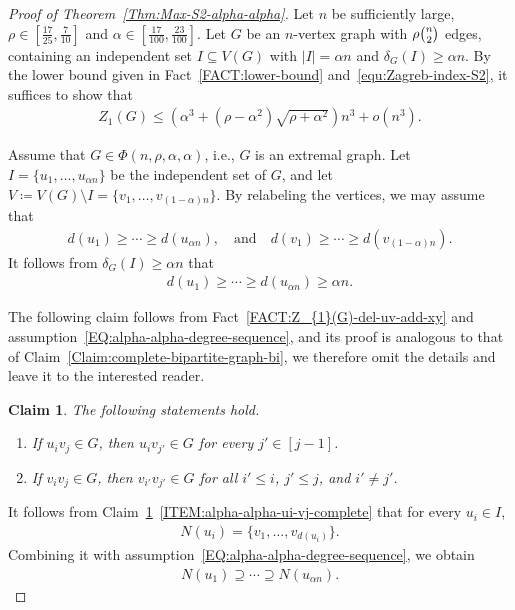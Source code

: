 \documentclass[11pt,a4paper]{article}
\newtheorem{claim}[definition]{Claim}
\begin{document}
\begin{proof}[Proof of Theorem~\ref{Thm:Max-S2-alpha-alpha}]
Let $n$ be sufficiently large, $\rho \in \left[\frac{17}{25}, \frac{7}{10} \right]$ and $\alpha \in \left[\frac{17}{100}, \frac{23}{100}\right]$. 
Let $G$ be an $n$-vertex graph with $\rho \tbinom{n}{2}$ edges, containing an independent set $I \subseteq V(G)$ with $|I| = \alpha n$ and $\delta_{G}(I) \ge \alpha n$. 
By the lower bound given in Fact~\ref{FACT:lower-bound} and~\eqref{equ:Zagreb-index-S2}, it suffices to show that  
\begin{align*}
Z_{1}(G) \le 
\left(\alpha^3+(\rho-\alpha^2) \sqrt{\rho+\alpha^2}\right) n^3 + o(n^3).  
\end{align*}

Assume that $G \in \Phi(n, \rho, \alpha, \alpha)$, i.e., $G$ is an extremal graph. 
Let $I = \{u_1,\ldots,u_{\alpha n}\}$ be the independent set of $G$, and let $V \coloneqq V(G) \setminus I=\{v_1,\ldots, v_{(1-\alpha)n}\}$. 
By relabeling the vertices, we may assume that 
\begin{align}\label{EQ:alpha-alpha-degree-sequence}
d(u_1) \ge \cdots \ge d(u_{\alpha n}), 
\quad \text{and} \quad
d(v_1) \ge \cdots \ge d(v_{(1-\alpha)n}). 
\end{align}
It follows from $\delta_{G}(I) \ge \alpha n$ that
\begin{align}\label{EQ:alpha-alpha-degree>alpha-n}
d(u_1) \ge \cdots \ge d(u_{\alpha n}) \ge \alpha n. 
\end{align}

The following claim follows from Fact~\ref{FACT:Z_{1}(G)-del-uv-add-xy} and assumption~\eqref{EQ:alpha-alpha-degree-sequence}, and its proof is analogous to that of Claim~\ref{Claim:complete-bipartite-graph-bi}, we therefore omit the details and leave it to the interested reader. 

\begin{claim}\label{Claim:assume-G-after-shifting}
The following statements hold.  
\begin{enumerate}[label=(\roman*)]
\item \label{ITEM:alpha-alpha-ui-vj-complete} If $u_iv_j \in G$, then  $u_iv_{j'} \in G$ for every $j' \in [j-1]$. 
\item \label{ITEM:alpha-alpha-vi-vj-complete} If $v_iv_j\in G$, then $v_{i'}v_{j'} \in G$ for all $i' \le i$, $j' \le j$, and $i' \neq j'$.
\end{enumerate}
\end{claim}

It follows from Claim~\ref{Claim:assume-G-after-shifting}~\ref{ITEM:alpha-alpha-ui-vj-complete} that for every $u_i \in I$, 
\begin{align}\label{EQ:alpha-alpha-neigh-u_i}
N(u_i) = \big\{v_1, \ldots, v_{d(u_i)}\big\}. 
\end{align}
Combining it with assumption~\eqref{EQ:alpha-alpha-degree-sequence}, we obtain
\begin{align}\label{EQ:Nu1-contain-Nu2-alpha}
N(u_1) \supseteq \cdots \supseteq N(u_{\alpha n}). 
\end{align}


\end{proof}
\end{document}
